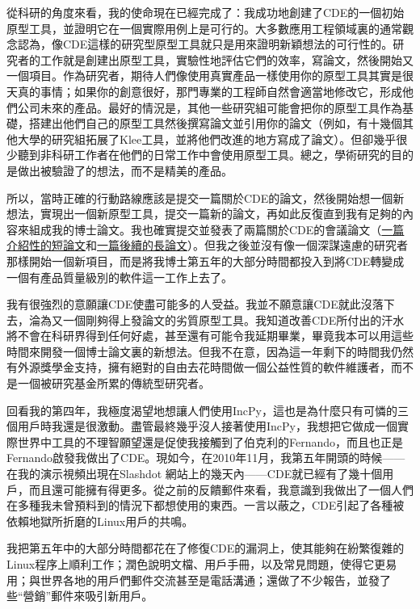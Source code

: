 \documentclass[12pt,UTF8,nofonts]{book}
\begin{document}
\breakline

從科研的角度來看，我的使命現在已經完成了：我成功地創建了CDE的一個初始原型工具，並證明它在一個實際用例上是可行的。大多數應用工程領域裏的通常觀念認為，像CDE這樣的研究型原型工具就只是用來證明新穎想法的可行性的。研究者的工作就是創建出原型工具，實驗性地評估它們的效率，寫論文，然後開始又一個項目。作為研究者，期待人們像使用真實產品一樣使用你的原型工具其實是很天真的事情；如果你的創意很好，那門專業的工程師自然會適當地修改它，形成他們公司未來的產品。最好的情況是，其他一些研究組可能會把你的原型工具作為基礎，搭建出他們自己的原型工具然後撰寫論文並引用你的論文（例如，有十幾個其他大學的研究組拓展了Klee工具，並將他們改進的地方寫成了論文）。但卻幾乎很少聽到非科研工作者在他們的日常工作中會使用原型工具。總之，學術研究的目的是做出被驗證了的想法，而不是精美的產品。

所以，當時正確的行動路線應該是提交一篇關於CDE的論文，然後開始想一個新想法，實現出一個新原型工具，提交一篇新的論文，再如此反復直到我有足夠的內容來組成我的博士論文。我也確實提交並發表了兩篇關於CDE的會議論文（\href{http://www.pgbovine.net/projects/pubs/guo_usenix11_camera_ready.pdf}{一篇介紹性的短論文}和\href{http://www.pgbovine.net/projects/pubs/cde_LISA.pdf}{一篇後續的長論文}）。但我之後並沒有像一個深謀遠慮的研究者那樣開始一個新項目，而是將我博士第五年的大部分時間都投入到將CDE轉變成一個有產品質量級別的軟件這一工作上去了。

我有很強烈的意願讓CDE使盡可能多的人受益。我並不願意讓CDE就此沒落下去，淪為又一個剛夠得上發論文的劣質原型工具。我知道改善CDE所付出的汗水將不會在科研界得到任何好處，甚至還有可能令我延期畢業，畢竟我本可以用這些時間來開發一個博士論文裏的新想法。但我不在意，因為這一年剩下的時間我仍然有外源獎學金支持，擁有絕對的自由去花時間做一個公益性質的軟件維護者，而不是一個被研究基金所累的傳統型研究者。

回看我的第四年，我極度渴望地想讓人們使用IncPy，這也是為什麼只有可憐的三個用戶時我還是很激動。盡管最終幾乎沒人接著使用IncPy，我想把它做成一個實際世界中工具的不理智願望還是促使我接觸到了伯克利的Fernando，而且也正是Fernando啟發我做出了CDE。現如今，在2010年11月，我第五年開頭的時候——在我的演示視頻出現在Slashdot 網站上的幾天內——CDE就已經有了幾十個用戶，而且還可能擁有得更多。從之前的反饋郵件來看，我意識到我做出了一個人們在多種我未曾預料到的情況下都想使用的東西。一言以蔽之，CDE引起了各種被依賴地獄所折磨的Linux用戶的共鳴。

\breakline

我把第五年中的大部分時間都花在了修復CDE的漏洞上，使其能夠在紛繁復雜的Linux程序上順利工作；潤色說明文檔、用戶手冊，以及常見問題，使得它更易用；與世界各地的用戶們郵件交流甚至是電話溝通；還做了不少報告，並發了些“營銷”郵件來吸引新用戶。
\end{document}
